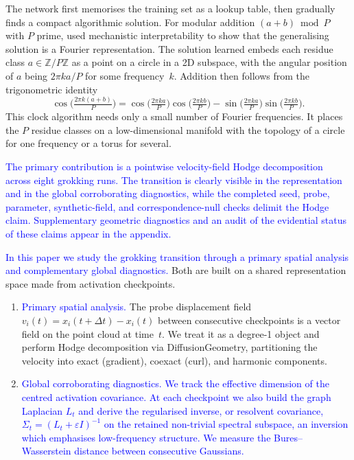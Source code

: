\documentclass[11pt]{article}
\newcommand{\addedtext}[1]{\textcolor{blue}{#1}}
\theoremstyle{remark}
\begin{document}
The network first memorises the training set as a lookup table, then gradually finds a compact algorithmic solution. For modular addition $(a + b) \bmod P$ with $P$ prime, \citet{nanda2023progress} used mechanistic interpretability to show that the generalising solution is a Fourier representation. The solution learned embeds each residue class $a \in \mathbb{Z}/P\mathbb{Z}$ as a point on a circle in a 2D subspace, with the angular position of $a$ being $2\pi k a / P$ for some frequency~$k$. Addition then follows from the trigonometric identity
\begin{equation}
\cos\!\bigl(\tfrac{2\pi k (a+b)}{P}\bigr) = \cos\!\bigl(\tfrac{2\pi k a}{P}\bigr)\cos\!\bigl(\tfrac{2\pi k b}{P}\bigr) - \sin\!\bigl(\tfrac{2\pi k a}{P}\bigr)\sin\!\bigl(\tfrac{2\pi k b}{P}\bigr).
\label{eq:clock-identity}
\end{equation}
This clock algorithm needs only a small number of Fourier frequencies. It places the $P$ residue classes on a low-dimensional manifold with the topology of a circle for one frequency or a torus for several.

\addedtext{The primary contribution is a pointwise velocity-field Hodge decomposition across eight grokking runs. The transition is clearly visible in the representation and in the global corroborating diagnostics, while the completed seed, probe, parameter, synthetic-field, and correspondence-null checks delimit the Hodge claim. Supplementary geometric diagnostics and an audit of the evidential status of these claims appear in the appendix.}

\addedtext{In this paper we study the grokking transition through a primary spatial analysis and complementary global diagnostics.} Both are built on a shared representation space made from activation checkpoints.

\begin{enumerate}
    \item \addedtext{Primary spatial analysis.} The probe displacement field $v_i(t) = x_i(t + \Delta t) - x_i(t)$ between consecutive checkpoints is a vector field on the point cloud at time~$t$. We treat it as a degree-1 object and perform Hodge decomposition via DiffusionGeometry, partitioning the velocity into exact (gradient), coexact (curl), and harmonic components.

    \item \addedtext{Global corroborating diagnostics. We track the effective dimension of the centred activation covariance. At each checkpoint we also build the graph Laplacian $L_t$ and derive the regularised inverse, or resolvent covariance, $\Sigma_t = (L_t + \varepsilon I)^{-1}$ on the retained non-trivial spectral subspace, an inversion which emphasises low-frequency structure. We measure the Bures--Wasserstein distance between consecutive Gaussians.}
\end{enumerate}
\end{document}
